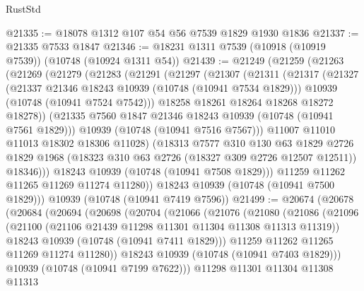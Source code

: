 \begin{lexlean}{RustStd}
\begin{coremodule}
@21335 := @18078 @1312 @107 @54 @56 @7539 @1829 @1930 @1836
@21337 := @21335 @7533 @1847
@21346 := @18231 @1311 @7539 (@10918 (@10919 @7539)) (@10748 (@10924 @1311 @54))
@21439 := @21249
    (@21259
      (@21263
        (@21269
          (@21279
            (@21283
              (@21291
                (@21297
                  (@21307
                    (@21311
                      (@21317
                        (@21327
                          (@21337 @21346 @18243 @10939 (@10748 (@10941 @7534 @1829)))
                          @10939
                          (@10748 (@10941 @7524 @7542)))
                        @18258
                        @18261
                        @18264
                        @18268
                        @18272
                        @18278))
                    (@21335 @7560 @1847 @21346 @18243 @10939 (@10748 (@10941 @7561 @1829)))
                    @10939
                    (@10748 (@10941 @7516 @7567)))
                  @11007
                  @11010
                  @11013
                  @18302
                  @18306
                  @11028)
                (@18313
                  @7577
                  @310
                  @130
                  @63
                  @1829
                  @2726
                  @1829
                  @1968
                  (@18323 @310 @63 @2726 (@18327 @309 @2726 @12507 @12511))
                  @18346)))
            @18243
            @10939
            (@10748 (@10941 @7508 @1829)))
          @11259
          @11262
          @11265
          @11269
          @11274
          @11280))
      @18243
      @10939
      (@10748 (@10941 @7500 @1829)))
    @10939
    (@10748 (@10941 @7419 @7596))
@21499 := @20674
    (@20678
      (@20684
        (@20694
          (@20698
            (@20704
              (@21066
                (@21076
                  (@21080
                    (@21086
                      (@21096
                        (@21100 (@21106 @21439 @11298 @11301 @11304 @11308 @11313 @11319))
                        @18243
                        @10939
                        (@10748 (@10941 @7411 @1829)))
                      @11259
                      @11262
                      @11265
                      @11269
                      @11274
                      @11280))
                  @18243
                  @10939
                  (@10748 (@10941 @7403 @1829)))
                @10939
                (@10748 (@10941 @7199 @7622)))
              @11298
              @11301
              @11304
              @11308
              @11313

\end{coremodule}
\end{lexlean}
